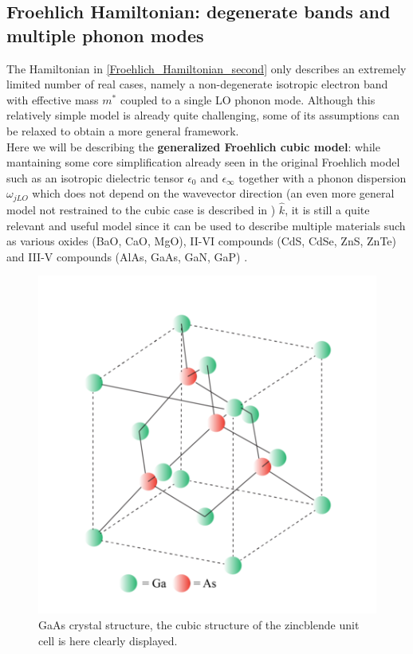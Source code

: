 \subsection{Froehlich Hamiltonian: degenerate bands and multiple phonon modes}
The Hamiltonian in \ref{Froehlich_Hamiltonian_second} only describes an extremely limited number of real cases, namely a non-degenerate 
isotropic electron band with effective mass $m^*$ coupled to a single LO phonon mode. Although this relatively simple model is already 
quite challenging, some of its assumptions can be relaxed to obtain a more general framework.\\
Here we will be describing the \textbf{generalized Froehlich cubic model}: while mantaining some core simplification already seen in the 
original Froehlich model such as an isotropic dielectric tensor $\epsilon_0$ and $\epsilon_\infty$ together with a phonon dispersion $\omega_{jLO}$ which 
does not depend on the wavevector direction (an even more general model not restrained to the cubic case is described in \cite{miglio2020predominance}) $\hat{k}$, it is still a quite relevant and useful model since 
it can be used to describe multiple materials such as various oxides (BaO, CaO, MgO), II-VI compounds (CdS, CdSe, ZnS, ZnTe) and 
III-V compounds (AlAs, GaAs, GaN, GaP) \cite{guster2021frohlich}.
\begin{figure}[H]
    \centering
    \includegraphics[scale=0.5]{GaAs_zincblende.png}
    \caption{GaAs crystal structure, the cubic structure of the zincblende unit cell is here clearly displayed.}
    \label{fig:GaAs_zincblende}
\end{figure}
